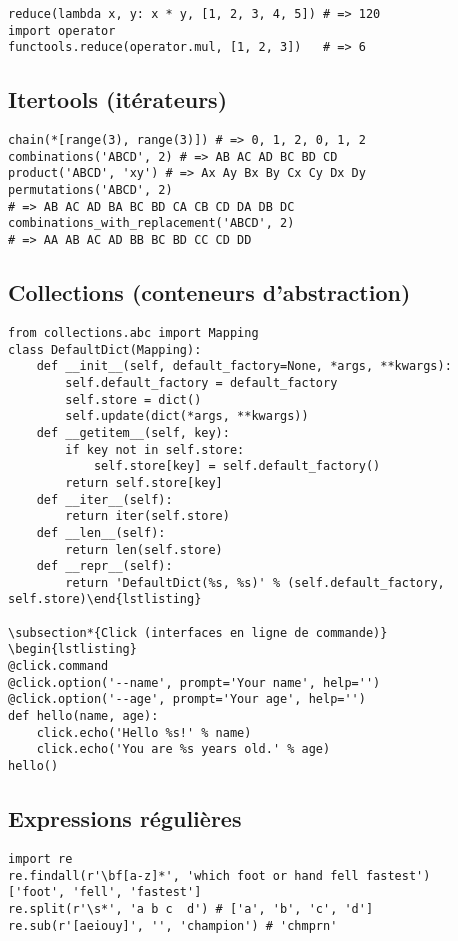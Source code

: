 \documentclass{article}
\begin{document}
\begin{multicols*}{4}
\begin{lstlisting}
reduce(lambda x, y: x * y, [1, 2, 3, 4, 5]) # => 120
import operator
functools.reduce(operator.mul, [1, 2, 3])   # => 6\end{lstlisting}

\subsection*{Itertools (itérateurs)}
\begin{lstlisting}
chain(*[range(3), range(3)]) # => 0, 1, 2, 0, 1, 2
combinations('ABCD', 2) # => AB AC AD BC BD CD
product('ABCD', 'xy') # => Ax Ay Bx By Cx Cy Dx Dy
permutations('ABCD', 2)
# => AB AC AD BA BC BD CA CB CD DA DB DC
combinations_with_replacement('ABCD', 2)
# => AA AB AC AD BB BC BD CC CD DD\end{lstlisting}

\subsection*{Collections (conteneurs d'abstraction)}
\begin{lstlisting}
from collections.abc import Mapping
class DefaultDict(Mapping):
    def __init__(self, default_factory=None, *args, **kwargs):
        self.default_factory = default_factory
        self.store = dict()
        self.update(dict(*args, **kwargs))
    def __getitem__(self, key):
        if key not in self.store:
            self.store[key] = self.default_factory()
        return self.store[key]
    def __iter__(self):
        return iter(self.store)
    def __len__(self):
        return len(self.store)
    def __repr__(self):
        return 'DefaultDict(%s, %s)' % (self.default_factory, self.store)\end{lstlisting}

\subsection*{Click (interfaces en ligne de commande)}
\begin{lstlisting}
@click.command
@click.option('--name', prompt='Your name', help='')
@click.option('--age', prompt='Your age', help='')
def hello(name, age):
    click.echo('Hello %s!' % name)
    click.echo('You are %s years old.' % age)
hello()\end{lstlisting}

\subsection*{Expressions régulières}
\begin{lstlisting}
import re
re.findall(r'\bf[a-z]*', 'which foot or hand fell fastest')
['foot', 'fell', 'fastest']
re.split(r'\s*', 'a b c  d') # ['a', 'b', 'c', 'd']
re.sub(r'[aeiouy]', '', 'champion') # 'chmprn'\end{lstlisting}


\end{multicols*}
\end{document}
